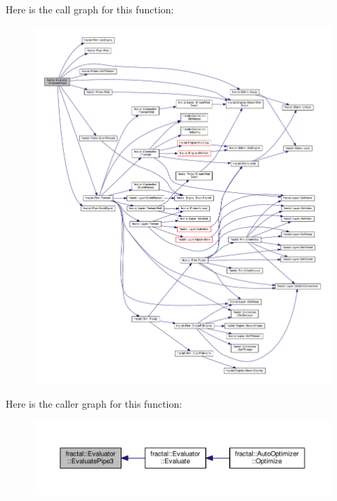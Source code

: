 Here is the call graph for this function\+:\nopagebreak
\begin{figure}[H]
\begin{center}
\leavevmode
\includegraphics[width=350pt]{d2/d13/classfractal_1_1Evaluator_a110e52128446e4a05007ba8a4660a665_cgraph}
\end{center}
\end{figure}




Here is the caller graph for this function\+:\nopagebreak
\begin{figure}[H]
\begin{center}
\leavevmode
\includegraphics[width=350pt]{d2/d13/classfractal_1_1Evaluator_a110e52128446e4a05007ba8a4660a665_icgraph}
\end{center}
\end{figure}


